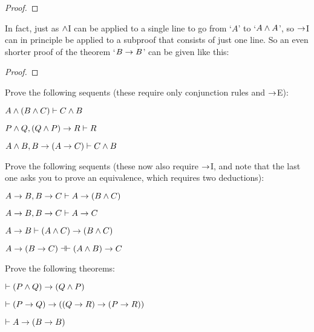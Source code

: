 \begin{proof}
\open
{} 
 
\close
{} 
\end{proof}

In fact, just as $\wedge$I can be applied to a single line to go from `$A$' to `$A \wedge A$', so $\rightarrow$I can in principle be applied to a subproof that consists of just one line.  So an even shorter proof of  the theorem `$B \rightarrow B$' can be given like this:\\

\begin{proof}
\open
{} 
\close
{} 
\end{proof}

\practiceproblems

\problempart
Prove the following sequents (these require only conjunction rules and $\rightarrow$E):

\begin{earg}
\item $A \wedge (B \wedge C) \vdash C \wedge B$
\item $P \wedge Q, (Q \wedge P) \rightarrow R \vdash R$
\item $A \wedge B, B \rightarrow (A \rightarrow C) \vdash C \wedge B$
\end{earg}

\problempart
Prove the following sequents (these now also require $\rightarrow$I, and note that the last one asks you to prove an equivalence, which requires two deductions):

\begin{earg}
\item $A \rightarrow B, B \rightarrow C \vdash A \rightarrow (B \wedge C)$
\item $A \rightarrow B, B \rightarrow C \vdash A \rightarrow C$
\item $A \rightarrow B \vdash (A \wedge C) \rightarrow (B \wedge C)$
\item $A \eif (B \eif C) \pequiv (A \eand B) \eif C$
\end{earg}


\problempart
Prove the following theorems:

\begin{earg}
\item $\vdash (P \wedge Q) \rightarrow (Q \wedge P)$
\item $\vdash (P \rightarrow Q) \rightarrow ((Q \rightarrow R) \rightarrow (P \rightarrow R))$
\item $\vdash A \rightarrow (B \rightarrow B)$
\end{earg}









